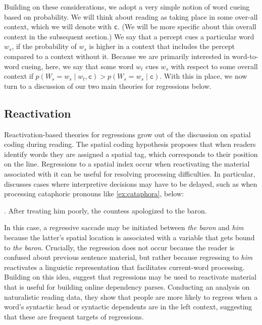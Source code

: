 \documentclass[12pt]{article}
\newcommand{\targetindex}{t}
\newcommand{\sourceindex}{s}
\newcommand{\target}{$w_{\targetindex}$\xspace}
\newcommand{\targetmath}{w_{\targetindex}}
\newcommand{\source}{$w_{\sourceindex}$\xspace}
\newcommand{\Sourcemath}{W_{\sourceindex}}
\newcommand{\sourcemath}{w_{\sourceindex}\xspace}
\newcommand{\context}{\texttt{c}\xspace}
\newcommand{\note}[4][]{\todo[author=#2,color=#3,size=\scriptsize,fancyline,caption={},#1]{#4}} %
\newcommand{\tiago}[2][]{\note[#1]{tiago}{cyan!40}{#2}}
\begin{document}
Building on these considerations, we adopt a very simple notion of word cueing based on probability. We will think about reading as taking place in some over-all context, which we will denote with \context. (We will be more specific about this overall context in the subsequent section.) We say that a percept cues a particular word \source, if the probability of \source is higher in a context that includes the percept compared to a context without it. Because we are primarily interested in word-to-word cueing, here, we say that some word \target  cues \source with respect to some overall context if $p( \Sourcemath = \sourcemath \mid \targetmath, \context) > p( \Sourcemath = \sourcemath \mid \context)$. With this in place, we now turn to a discussion of our two main theories for regressions below.

\subsection{Reactivation}

Reactivation-based theories for regressions grow out of the discussion on spatial coding during reading. The spatial coding hypothesis \citep{kennedy1987spatial, kennedy1992spatial, kennedy2003reader} proposes that when readers identify words they are assigned a spatial tag, which corresponds to their position on the line. Regressions to a spatial index occur when reactivating the material associated with it can be useful for resolving processing difficulties. In particular, \citet{kennedy1987spatial} discusses cases where interpretive decisions may have to be delayed, such as when processing cataphoric pronouns like \ref{ex:cataphora}, below:

\ex. After treating him poorly, the countess apologized to the baron. \label{ex:cataphora}

In this case, a regressive saccade may be initiated between \textit{the baron} and \textit{him} because the latter's spatial location is associated with a variable that gets bound to \textit{the baron}. Crucially, the regression does not occur because the reader is confused about previous sentence material, but rather because regressing to \textit{him} reactivates a linguistic representation that facilitates current-word processing. Building on this idea, \citet{lopopolo2019dependency} suggest that regressions may be used to reactivate material that is useful for building online dependency parses. Conducting an analysis on naturalistic reading data, they show that people are more likely to regress when a word’s syntactic head or syntactic dependents are in the left context, suggesting that these are frequent targets of regressions.
\end{document}
